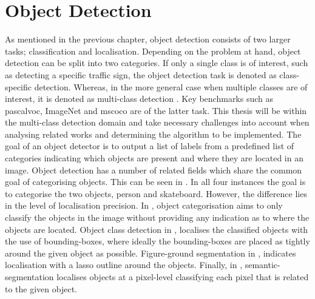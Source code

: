 \section{Object Detection}
As mentioned in the previous chapter, object detection consists of two larger tasks; classification and localisation. Depending on the problem at hand, object detection can be split into two categories. If only a single class is of interest, such as detecting a specific traffic sign, the object detection task is denoted as class-specific detection. Whereas, in the more general case when multiple classes are of interest, it is denoted as multi-class detection \cite{zhang}. Key benchmarks such as \gls{pascalvoc}, ImageNet and \gls{mscoco} are of the latter task. This thesis will be within the multi-class detection domain and take necessary challenges into account when analysing related works and determining the algorithm to be implemented. The goal of an object detector is to output a list of labels from a predefined list of categories indicating which objects are present and where they are located in an image. Object detection has a number of related fields which share the common goal of categorising objects. This can be seen in . In all four instances the goal is to categorise the two objects, person and skateboard. However, the difference lies in the level of localisation precision. In , object categorisation aims to only classify the objects in the image without providing any indication as to where the objects are located. Object class detection in , localises the classified objects with the use of bounding-boxes, where ideally the bounding-boxes are placed as tightly around the given object as possible. Figure-ground segmentation in , indicates localisation with a lasso outline around the objects. Finally, in , semantic-segmentation localises objects at a pixel-level classifying each pixel that is related to the given object. 

